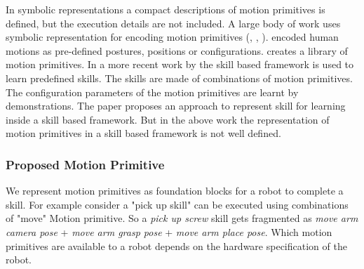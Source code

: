 In symbolic representations a compact descriptions of motion primitives is defined, but the
execution details are not included. A large body of work uses symbolic
representation for encoding motion primitives (\cite{muench_robot_1994},
\cite{friedrich_robot_1996}, \cite{pardowitz_incremental_2007}).
\cite{alissandrakis_approach_2005} encoded human motions as
pre-defined postures, positions or configurations. \cite{aein_toward_2013} creates a library
of motion primitives. In a more recent work by \cite{andersen_using_2014} the skill
based framework is used to learn predefined
skills. The skills are made of combinations of motion primitives. The configuration
parameters of the motion primitives are learnt by demonstrations. The paper proposes an
approach to represent skill for learning inside a skill based framework.
But in the above work the representation of motion primitives in a skill based framework is
not well defined.

\subsubsection{Proposed Motion Primitive }
\label{sec:Proposed motion primitive}
We represent motion primitives as foundation blocks
for a robot to complete a skill. For example consider a "pick up skill" can be
executed using combinations of "move" Motion primitive. So a \textit{pick up screw}
skill gets fragmented as \textit{move arm camera pose} + \textit{move arm grasp pose} + \textit{move
arm place pose}. Which motion primitives are available to a robot depends on the hardware
specification of the robot.

